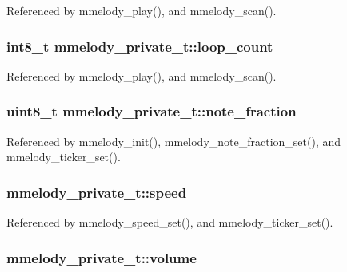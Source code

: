 Referenced by mmelody\_\-play(), and mmelody\_\-scan().\hypertarget{structmmelody__private__t_400cd0e27228c0ef7ccffb2fec46d7a5}{
\subsubsection{\setlength{\rightskip}{0pt plus 5cm}int8\_\-t {\bf mmelody\_\-private\_\-t::loop\_\-count}}}
\label{structmmelody__private__t_400cd0e27228c0ef7ccffb2fec46d7a5}




Referenced by mmelody\_\-play(), and mmelody\_\-scan().\hypertarget{structmmelody__private__t_381c6b139bb4fb5630eb9639f8b57b4a}{
\subsubsection{\setlength{\rightskip}{0pt plus 5cm}uint8\_\-t {\bf mmelody\_\-private\_\-t::note\_\-fraction}}}
\label{structmmelody__private__t_381c6b139bb4fb5630eb9639f8b57b4a}




Referenced by mmelody\_\-init(), mmelody\_\-note\_\-fraction\_\-set(), and mmelody\_\-ticker\_\-set().\hypertarget{structmmelody__private__t_97d560b5c8a9ce70d4064d02c29db281}{
\subsubsection{ {\bf mmelody\_\-private\_\-t::speed}}}
\label{structmmelody__private__t_97d560b5c8a9ce70d4064d02c29db281}




Referenced by mmelody\_\-speed\_\-set(), and mmelody\_\-ticker\_\-set().\hypertarget{structmmelody__private__t_392d14ffcc6e5510349d8a7ef7da593e}{
\subsubsection{ {\bf mmelody\_\-private\_\-t::volume}}}
\label{structmmelody__private__t_392d14ffcc6e5510349d8a7ef7da593e}




